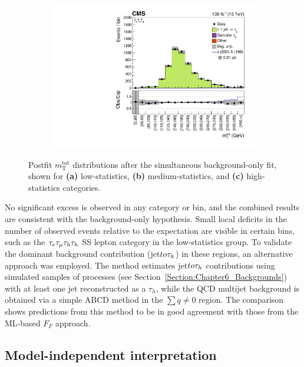 \begin{figure}[!htbp]
\begin{subfigure}[b]{0.49\textwidth}
            \centering
            \includegraphics[width=\textwidth]{Figures/Chapter6/postfit_plots_combined_postfit_high_stat_paper.pdf}
            \caption{}
        \end{subfigure}

    \caption[Postfit $m_\mathrm{T}^\mathrm{tot}$ distributions in low-, medium-, and high-statistics categories.]{Postfit $m_\mathrm{T}^\mathrm{tot}$ distributions after the simultaneous background-only fit, shown for \textbf{(a)} low-statistics, \textbf{(b)} medium-statistics, and \textbf{(c)} high-statistics categories.}

    \label{Figure:Chapter6_PostfitDistributions}
\end{figure}

No significant excess is observed in any category or bin, and the combined results are consistent with the background-only hypothesis. Small local deficits in the number of observed events relative to the expectation are visible in certain bins, such as the $\tau_e\tau_\mu\tau_h\tau_h$ SS lepton category in the low-statistics group. To validate the dominant background contribution (jet$to\tau_h$) in these regions, an alternative approach was employed. The method estimates jet$to\tau_h$ contributions using simulated samples of processes (see Section~\ref{Section:Chapter6_Backgrounds}) with at least one jet reconstructed as a $\tau_{h}$, while the QCD multijet background is obtained via a simple ABCD method in the $\sum q \neq 0$ region. The comparison shows predictions from this method to be in good agreement with those from the ML-based $F_F$ approach.

\newpage
\subsection{Model-independent interpretation}

